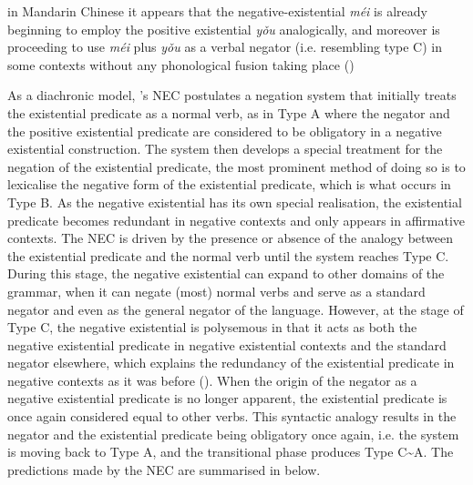 \documentclass[output=paper]{langscibook}
\begin{document}
\begin{displayquote}
in Mandarin Chinese it appears that the negative-existential \textit{méi} is already beginning to employ the positive existential \textit{yǒu} analogically, and moreover is proceeding to use \textit{méi} plus \textit{yǒu} as a verbal negator (i.e. resembling type C) in some contexts without any phonological fusion taking place (\citealt[23]{Croft1991})
\end{displayquote}


As a diachronic model, \citeauthor{Croft1991}'s NEC postulates a negation system that initially treats the existential predicate as a normal verb, as in Type A where the negator and the positive existential predicate are considered to be obligatory in a negative existential construction. The system then develops a special treatment for the negation of the existential predicate, the most prominent method of doing so is to lexicalise the negative form of the existential predicate, which is what occurs in Type B. As the negative existential has its own special realisation, the existential predicate becomes redundant in negative contexts and only appears in affirmative contexts. The NEC is driven by the presence or absence of the analogy between the existential predicate and the normal verb until the system reaches Type C. During this stage, the negative existential can expand to other domains of the grammar, when it can negate (most) normal verbs and serve as a standard negator and even as the general negator of the language. However, at the stage of Type C, the negative existential is polysemous in that it acts as both the negative existential predicate in negative existential contexts and the standard negator elsewhere, which explains the redundancy of the existential predicate in negative contexts as it was before (\citealt[12]{Croft1991}). When the origin of the negator as a negative existential predicate is no longer apparent, the existential predicate is once again considered equal to other verbs. This syntactic analogy results in the negator and the existential predicate being obligatory once again, i.e. the system is moving back to Type A, and the transitional phase produces Type C\sim A. The predictions made by the NEC are summarised in  below.
\end{document}
